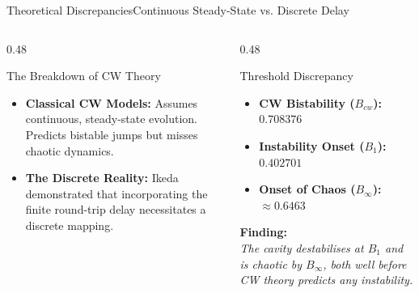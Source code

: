 \documentclass[aspectratio=169]{beamer}
\begin{document}
\begin{frame}{Theoretical Discrepancies}{Continuous Steady-State vs. Discrete Delay}
    \vspace{-0.3cm}
    \begin{columns}[T, onlytextwidth]
        
        \begin{column}{0.48\textwidth}
            \begin{customblock}{The Breakdown of CW Theory}
                \small
                \begin{itemize}
                    \item \textbf{Classical CW Models:} Assumes continuous, steady-state evolution. Predicts bistable jumps but misses chaotic dynamics.
                    \item \textbf{The Discrete Reality:} Ikeda demonstrated that incorporating the finite round-trip delay necessitates a discrete mapping.
                \end{itemize}
            \end{customblock}
        \end{column}
        
        \begin{column}{0.48\textwidth}
            \begin{customblock}{Threshold Discrepancy}
                \small
                \begin{itemize}
                    \item \textbf{CW Bistability ($B_{cw}$):} $0.708376$
                    \item \textbf{Instability Onset ($B_1$):} $0.402701$
                    \item \textbf{Onset of Chaos ($B_\infty$):} $\approx 0.6463$
                \end{itemize}
                \vspace{0.2cm}
                \textbf{Finding:} \\
                \textit{The cavity destabilises at $B_1$ and is chaotic by $B_\infty$, both well before CW theory predicts any instability.}
            \end{customblock}
        \end{column}
        
    \end{columns}
\end{frame}
\end{document}
